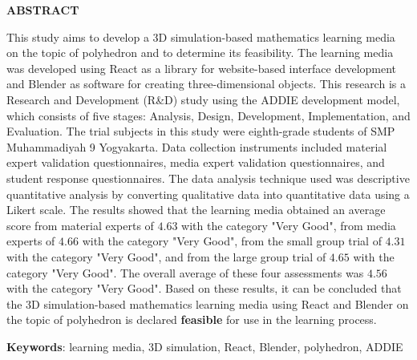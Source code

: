 \vspace{1cm}

\begin{center}
    \textbf{ABSTRACT}
\end{center}

\hspace*{1cm}This study aims to develop a 3D simulation-based mathematics learning media on the topic of polyhedron and to determine its feasibility. The learning media was developed using React as a library for website-based interface development and Blender as software for creating three-dimensional objects. This research is a Research and Development (R\&D) study using the ADDIE development model, which consists of five stages: Analysis, Design, Development, Implementation, and Evaluation. The trial subjects in this study were eighth-grade students of SMP Muhammadiyah 9 Yogyakarta. Data collection instruments included material expert validation questionnaires, media expert validation questionnaires, and student response questionnaires. The data analysis technique used was descriptive quantitative analysis by converting qualitative data into quantitative data using a Likert scale. The results showed that the learning media obtained an average score from material experts of \(4.63\) with the category "Very Good", from media experts of \(4.66\) with the category "Very Good", from the small group trial of \(4.31\) with the category "Very Good", and from the large group trial of \(4.65\) with the category "Very Good". The overall average of these four assessments was \(4.56\) with the category "Very Good". Based on these results, it can be concluded that the 3D simulation-based mathematics learning media using React and Blender on the topic of polyhedron is declared \textbf{feasible} for use in the learning process.

\vspace{0.5cm}

\textbf{Keywords}: learning media, 3D simulation, React, Blender, polyhedron, ADDIE

\newpage
